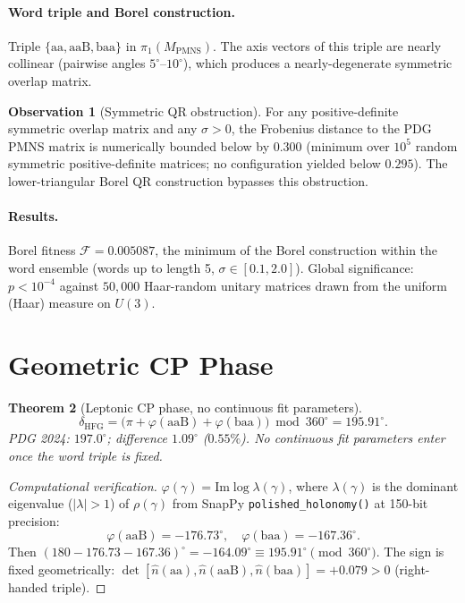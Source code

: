 \documentclass[11pt,a4paper]{article}
\newtheorem{theorem}{Theorem}
\theoremstyle{definition}
\newtheorem{observation}[theorem]{Observation}
\theoremstyle{remark}
\newcommand{\MPMNS}{M_{\mathrm{PMNS}}}
\begin{document}
\paragraph{Word triple and Borel construction.}
Triple $\{\mathrm{aa},\mathrm{aaB},\mathrm{baa}\}$
in $\pi_1(\MPMNS)$.
The axis vectors of this triple are nearly collinear
(pairwise angles $5^\circ$--$10^\circ$), which produces a
nearly-degenerate symmetric overlap matrix.

\begin{observation}[Symmetric QR obstruction]
\label{obs:obstruction}
For any positive-definite symmetric overlap matrix and any
$\sigma>0$, the Frobenius distance to the PDG PMNS matrix is
numerically bounded below by $0.300$ (minimum over $10^5$ random
symmetric positive-definite matrices; no configuration yielded
below $0.295$).
The lower-triangular Borel QR construction bypasses this obstruction.
\end{observation}

\paragraph{Results.}
Borel fitness $\mathcal{F}=0.005087$, the minimum of the Borel
construction within the word ensemble
(words up to length 5, $\sigma\in[0.1,2.0]$).
Global significance: $p<10^{-4}$ against $50{,}000$ Haar-random
unitary matrices drawn from the uniform (Haar) measure on $U(3)$.

\section{Geometric CP Phase}
\label{sec:cp}

\begin{theorem}[Leptonic CP phase, no continuous fit parameters]
\label{thm:cp}
\[
  \delta_{\mathrm{HFG}}
  = \bigl(\pi + \varphi(\mathrm{aaB}) + \varphi(\mathrm{baa})\bigr)
    \bmod 360^\circ
  = 195.91^\circ.
\]
PDG 2024: $197.0^\circ$; difference $1.09^\circ$ ($0.55\%$).
No continuous fit parameters enter once the word triple is fixed.
\end{theorem}

\begin{proof}[Computational verification]
$\varphi(\gamma)=\mathrm{Im}\log\lambda(\gamma)$,
where $\lambda(\gamma)$ is the dominant eigenvalue
($|\lambda|>1$) of $\rho(\gamma)$ from SnapPy
\texttt{polished\_holonomy()} at 150-bit precision:
\[
  \varphi(\mathrm{aaB}) = -176.73^\circ,
  \quad
  \varphi(\mathrm{baa}) = -167.36^\circ.
\]
Then $(180 - 176.73 - 167.36)^\circ
= -164.09^\circ \equiv 195.91^\circ \pmod{360^\circ}$.
The sign is fixed geometrically:
$\det[\hat{n}(\mathrm{aa}),\hat{n}(\mathrm{aaB}),
\hat{n}(\mathrm{baa})] = +0.079 > 0$ (right-handed triple).
\end{proof}
\end{document}
